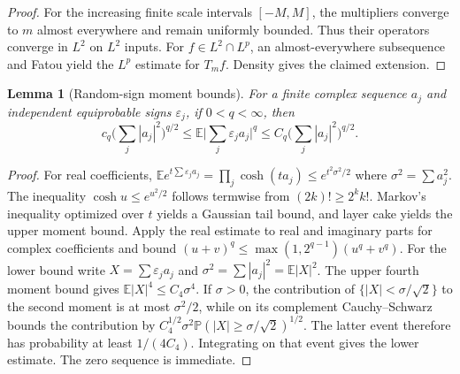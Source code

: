 \documentclass[11pt,oneside,openany]{book}
\newtheorem{lemma}[theorem]{Lemma}
\theoremstyle{definition}
\theoremstyle{remark}
\begin{document}
\begin{proof}
For the increasing finite scale intervals \([-M,M]\), the multipliers converge to \(m\) almost everywhere and remain uniformly bounded. Thus their operators converge in \(L^2\) on \(L^2\) inputs. For \(f\in L^2\cap L^p\), an almost-everywhere subsequence and Fatou yield the \(L^p\) estimate for \(T_mf\). Density gives the claimed extension.
\end{proof}

\begin{lemma}[Random-sign moment bounds]
For a finite complex sequence \(a_j\) and independent equiprobable signs \(\varepsilon_j\), if \(0<q<\infty\), then
\[
 c_q\Big(\sum_j|a_j|^2\Big)^{q/2}
 \le \mathbb E\Big|\sum_j\varepsilon_j a_j\Big|^q
 \le C_q\Big(\sum_j|a_j|^2\Big)^{q/2}.
\]
\end{lemma}
\begin{proof}
For real coefficients, \(\mathbb E e^{t\sum\varepsilon_j a_j}=\prod_j\cosh(ta_j)\le e^{t^2\sigma^2/2}\) where \(\sigma^2=\sum a_j^2\). The inequality \(\cosh u\le e^{u^2/2}\) follows termwise from \((2k)!\ge 2^k k!\). Markov's inequality optimized over \(t\) yields a Gaussian tail bound, and layer cake yields the upper moment bound. Apply the real estimate to real and imaginary parts for complex coefficients and bound \((u+v)^q\le\max(1,2^{q-1})(u^q+v^q)\). For the lower bound write \(X=\sum\varepsilon_j a_j\) and \(\sigma^2=\sum|a_j|^2=\mathbb E|X|^2\). The upper fourth moment bound gives \(\mathbb E|X|^4\le C_4\sigma^4\). If \(\sigma>0\), the contribution of \(\{|X|<\sigma/\sqrt2\}\) to the second moment is at most \(\sigma^2/2\), while on its complement Cauchy--Schwarz bounds the contribution by \(C_4^{1/2}\sigma^2\mathbb P(|X|\ge\sigma/\sqrt2)^{1/2}\). The latter event therefore has probability at least \(1/(4C_4)\). Integrating on that event gives the lower estimate. The zero sequence is immediate.
\end{proof}
\end{document}
